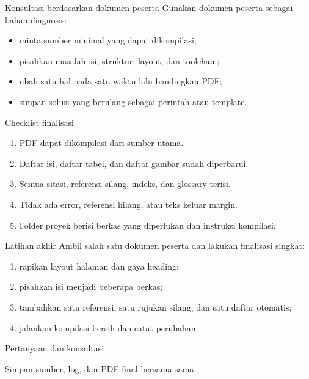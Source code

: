 \documentclass[aspectratio=169,11pt]{beamer}
\begin{document}
\begin{frame}{Konsultasi berdasarkan dokumen peserta}
Gunakan dokumen peserta sebagai bahan diagnosis:
\begin{itemize}
\item minta sumber minimal yang dapat dikompilasi;
\item pisahkan masalah isi, struktur, layout, dan toolchain;
\item ubah satu hal pada satu waktu lalu bandingkan PDF;
\item simpan solusi yang berulang sebagai perintah atau template.
\end{itemize}
\end{frame}
\begin{frame}{Checklist finalisasi}
\begin{enumerate}
\item PDF dapat dikompilasi dari sumber utama.
\item Daftar isi, daftar tabel, dan daftar gambar sudah diperbarui.
\item Semua sitasi, referensi silang, indeks, dan glossary terisi.
\item Tidak ada error, referensi hilang, atau teks keluar margin.
\item Folder proyek berisi berkas yang diperlukan dan instruksi kompilasi.
\end{enumerate}
\end{frame}
\begin{frame}{Latihan akhir}
Ambil salah satu dokumen peserta dan lakukan finalisasi singkat:
\begin{enumerate}
\item rapikan layout halaman dan gaya heading;
\item pisahkan isi menjadi beberapa berkas;
\item tambahkan satu referensi, satu rujukan silang, dan satu daftar otomatis;
\item jalankan kompilasi bersih dan catat perubahan.
\end{enumerate}
\end{frame}
\begin{frame}[plain]
\centering\Large Pertanyaan dan konsultasi\par\bigskip\normalsize
Simpan sumber, log, dan PDF final bersama-sama.
\end{frame}
\end{document}
